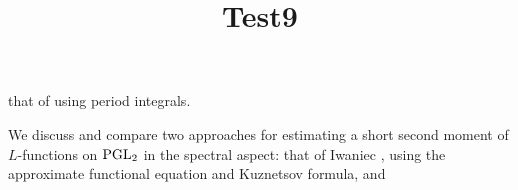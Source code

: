 \documentclass[reqno]{amsart} 
\title{Test9}
\numberwithin{equation}{section}
\numberwithin{theorem}{section}
\begin{document}
\maketitle
\tableofcontents


that of \cite{2021arXiv210915230N} using period integrals.

We discuss and compare two approaches for estimating a short second moment of $L$-functions on $\operatorname{PGL}_2$ in the spectral aspect: that of Iwaniec \cite{Iwaniec1992}, using the approximate functional equation and Kuznetsov formula, and




{} 
\end{document}
